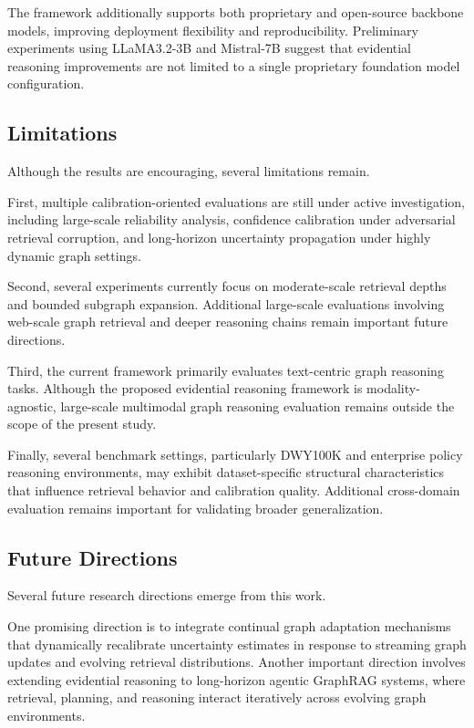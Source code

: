 \documentclass[sigconf,review,anonymous]{acmart}
\begin{document}
The framework additionally supports both proprietary and open-source backbone models, improving deployment flexibility and reproducibility. Preliminary experiments using LLaMA3.2-3B and Mistral-7B suggest that evidential reasoning improvements are not limited to a single proprietary foundation model configuration.

\subsection{Limitations}

Although the results are encouraging, several limitations remain.

First, multiple calibration-oriented evaluations are still under active investigation, including large-scale reliability analysis, confidence calibration under adversarial retrieval corruption, and long-horizon uncertainty propagation under highly dynamic graph settings.

Second, several experiments currently focus on moderate-scale retrieval depths and bounded subgraph expansion. Additional large-scale evaluations involving web-scale graph retrieval and deeper reasoning chains remain important future directions.

Third, the current framework primarily evaluates text-centric graph reasoning tasks. Although the proposed evidential reasoning framework is modality-agnostic, large-scale multimodal graph reasoning evaluation remains outside the scope of the present study.

Finally, several benchmark settings, particularly DWY100K and enterprise policy reasoning environments, may exhibit dataset-specific structural characteristics that influence retrieval behavior and calibration quality. Additional cross-domain evaluation remains important for validating broader generalization.

\subsection{Future Directions}

Several future research directions emerge from this work.

One promising direction is to integrate continual graph adaptation mechanisms that dynamically recalibrate uncertainty estimates in response to streaming graph updates and evolving retrieval distributions. Another important direction involves extending evidential reasoning to long-horizon agentic GraphRAG systems, where retrieval, planning, and reasoning interact iteratively across evolving graph environments.
\end{document}
